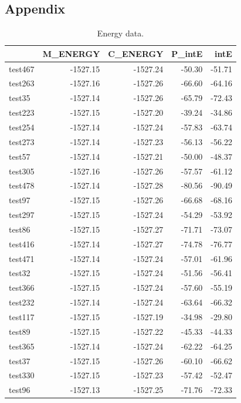 \documentclass[journal=jacsat,manuscript=article]{achemso}
\begin{document}
 \subsection{Appendix}
\begin{table}[b!]
\centering
\caption{Energy data.}
\label{tab:energy_raw}
\begin{tabular}{lrrrr}
\toprule
{} &  M\_ENERGY &  C\_ENERGY &  P\_intE &    intE \\
\midrule
test467 &  -1527.15 &  -1527.24 &  -50.30 &  -51.71 \\
test263 &  -1527.16 &  -1527.26 &  -66.60 &  -64.16 \\
test35  &  -1527.14 &  -1527.26 &  -65.79 &  -72.43 \\
test223 &  -1527.15 &  -1527.20 &  -39.24 &  -34.86 \\
test254 &  -1527.14 &  -1527.24 &  -57.83 &  -63.74 \\
test273 &  -1527.14 &  -1527.23 &  -56.13 &  -56.22 \\
test57  &  -1527.14 &  -1527.21 &  -50.00 &  -48.37 \\
test305 &  -1527.16 &  -1527.26 &  -57.57 &  -61.12 \\
test478 &  -1527.14 &  -1527.28 &  -80.56 &  -90.49 \\
test97  &  -1527.15 &  -1527.26 &  -66.68 &  -68.16 \\
test297 &  -1527.15 &  -1527.24 &  -54.29 &  -53.92 \\
test86  &  -1527.15 &  -1527.27 &  -71.71 &  -73.07 \\
test416 &  -1527.14 &  -1527.27 &  -74.78 &  -76.77 \\
test471 &  -1527.14 &  -1527.24 &  -57.01 &  -61.96 \\
test32  &  -1527.15 &  -1527.24 &  -51.56 &  -56.41 \\
test366 &  -1527.15 &  -1527.24 &  -57.60 &  -55.19 \\
test232 &  -1527.14 &  -1527.24 &  -63.64 &  -66.32 \\
test117 &  -1527.15 &  -1527.19 &  -34.98 &  -29.80 \\
test89  &  -1527.15 &  -1527.22 &  -45.33 &  -44.33 \\
test365 &  -1527.14 &  -1527.24 &  -62.22 &  -64.25 \\
test37  &  -1527.15 &  -1527.26 &  -60.10 &  -66.62 \\
test330 &  -1527.15 &  -1527.23 &  -57.42 &  -52.47 \\
test96  &  -1527.13 &  -1527.25 &  -71.76 &  -72.33 \\

\end{tabular}
\end{table}
\end{document}
